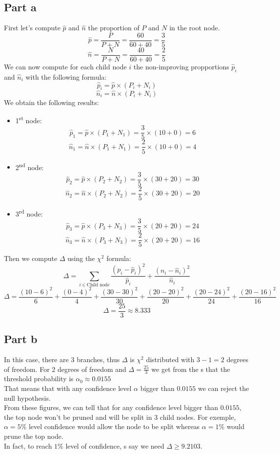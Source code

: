 \documentclass[a4paper, 10pt]{article}
\begin{document}
\subsection{Part a}
First let's compute $\hat{p}$ and $ \hat{n}$ the proportion of $P$ and $N$ in the root node.
$$
\hat{p} = \frac{P}{P+N} = \frac{60}{60+40} = \frac{3}{5}
$$
$$
\hat{n} = \frac{N}{P+N} = \frac{40}{60+40} = \frac{2}{5}
$$
We can now compute for each child node $i$ the non-improving propportions $\hat{p}_i$ and $\hat{n}_i$
with the following formula:
$$
\hat{p}_i = \hat{p} \times (P_i + N_i)
$$
$$
\hat{n}_i = \hat{n} \times (P_i + N_i)
$$
We obtain the following results:
\begin{itemize}
    \item 1\textsuperscript{st} node:
    $$
    \hat{p}_1 = \hat{p} \times (P_1 + N_1) = \frac{3}{5}\times(10 +0) = 6
    $$
    $$
    \hat{n}_1 = \hat{n} \times (P_1 + N_1) = \frac{2}{5}\times(10 +0) = 4
    $$

    \item 2\textsuperscript{nd} node:
    $$
    \hat{p}_2 = \hat{p} \times (P_2 + N_2) = \frac{3}{5}\times(30 + 20) = 30
    $$
    $$
    \hat{n}_2 = \hat{n} \times (P_2 + N_2) = \frac{2}{5}\times(30 + 20) = 20
    $$

    \item 3\textsuperscript{rd} node:
    $$
    \hat{p}_3 = \hat{p} \times (P_3 + N_3) = \frac{3}{5}\times(20 +20) = 24
    $$
    $$
    \hat{n}_3 = \hat{n} \times (P_3 + N_3) = \frac{2}{5}\times(20 +20) = 16
    $$
\end{itemize}
Then we compute $\Delta$ using the $\chi^2$ formula:
$$
\Delta = \sum_{i\in\text{Child node}} \frac{(p_i-\hat{p}_i)^2}{\hat{p}_i} + \frac{(n_i-\hat{n}_i)^2}{\hat{n}_i}
$$
$$
\Delta = \frac{(10-6)^2}{6}+\frac{(0-4)^2}{4}+\frac{(30-30)^2}{30}+\frac{(20-20)^2}{20}+\frac{(20-24)^2}{24}+\frac{(20-16)^2}{16}
$$
$$
\Delta = \frac{25}{3} \approx 8.333
$$

\subsection{Part b}
In this case, there are 3 branches, thus $\Delta$ is $\chi^2$ distributed with
$3-1=2$ degrees of freedom. For 2 degrees of freedom and $\Delta=\frac{25}{3}$ we get from the s that the
threshold probability is $\alpha_{0}\approx0.0155$
\\
That means that with any confidence level $\alpha$ bigger than $0.0155$ we can reject the null
hypothesis.
\\
From these figures, we can tell that for any confidence level bigger than $0.0155$, the top node won't
be pruned and will be split in 3 child nodes. For exemple, $\alpha=5\%$ level confidence would allow
the node to be split whereas $\alpha=1\%$ would prune the top node. 
\\
In fact, to reach $1\%$ level of confidence, s say we need $\Delta \geq 9.2103$.
\end{document}
